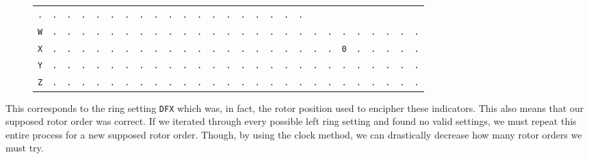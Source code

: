\begin{figure}[H]
\begin{center}
{\begin{tabular}{c|cccccccccccccccccccccccccc}
				\texttt{.} & \texttt{.} & \texttt{.} & \texttt{.} &
				\texttt{.} & \texttt{.} & \texttt{.} & \texttt{.} &
				\texttt{.} & \texttt{.} & \texttt{.} & \texttt{.} &
				\texttt{.} & \texttt{.} & \texttt{.} & \texttt{.} &
				\texttt{.} & \texttt{.} & \texttt{.}                             \\
				\texttt{W} & \texttt{.} & \texttt{.} & \texttt{.} &
				\texttt{.} & \texttt{.} & \texttt{.} & \texttt{.} &
				\texttt{.} & \texttt{.} & \texttt{.} & \texttt{.} &
				\texttt{.} & \texttt{.} & \texttt{.} & \texttt{.} &
				\texttt{.} & \texttt{.} & \texttt{.} & \texttt{.} &
				\texttt{.} & \texttt{.} & \texttt{.} & \texttt{.} &
				\texttt{.} & \texttt{.} & \texttt{.}                             \\
				\texttt{X} & \texttt{.} & \texttt{.} & \texttt{.} &
				\texttt{.} & \texttt{.} & \texttt{.} & \texttt{.} &
				\texttt{.} & \texttt{.} & \texttt{.} & \texttt{.} &
				\texttt{.} & \texttt{.} & \texttt{.} & \texttt{.} &
				\texttt{.} & \texttt{.} & \texttt{.} & \texttt{.} &
				\texttt{.} & \texttt{0} & \texttt{.} & \texttt{.} &
				\texttt{.} & \texttt{.} & \texttt{.}                             \\
				\texttt{Y} & \texttt{.} & \texttt{.} & \texttt{.} &
				\texttt{.} & \texttt{.} & \texttt{.} & \texttt{.} &
				\texttt{.} & \texttt{.} & \texttt{.} & \texttt{.} &
				\texttt{.} & \texttt{.} & \texttt{.} & \texttt{.} &
				\texttt{.} & \texttt{.} & \texttt{.} & \texttt{.} &
				\texttt{.} & \texttt{.} & \texttt{.} & \texttt{.} &
				\texttt{.} & \texttt{.} & \texttt{.}                             \\
				\texttt{Z} & \texttt{.} & \texttt{.} & \texttt{.} &
				\texttt{.} & \texttt{.} & \texttt{.} & \texttt{.} &
				\texttt{.} & \texttt{.} & \texttt{.} & \texttt{.} &
				\texttt{.} & \texttt{.} & \texttt{.} & \texttt{.} &
				\texttt{.} & \texttt{.} & \texttt{.} & \texttt{.} &
				\texttt{.} & \texttt{.} & \texttt{.} & \texttt{.} &
				\texttt{.} & \texttt{.} & \texttt{.}                             \\
			\end{tabular}
		}
	\end{center}
\end{figure}
\noindent This corresponds to the ring setting \texttt{DFX} which
was, in fact, the rotor position used to encipher these indicators.
This also means that our supposed rotor order was correct. If we
iterated through every possible left ring setting and found no valid
settings, we must repeat this entire process for a new supposed rotor
order. Though, by using the clock method, we can drastically decrease
how many rotor orders we must try.

